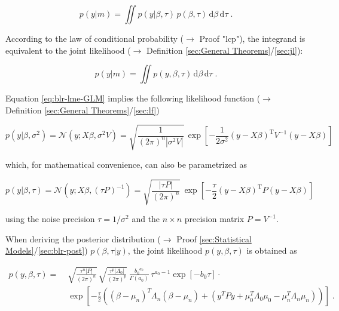 \documentclass[a4paper,12pt]{book}
\begin{document}
\begin{equation} \label{eq:blr-lme-GLM-NG-ME-s1}
p(y|m) = \iint p(y|\beta,\tau) \, p(\beta,\tau) \, \mathrm{d}\beta \, \mathrm{d}\tau \; .
\end{equation}

According to the law of conditional probability ($\rightarrow$ Proof "lcp"), the integrand is equivalent to the joint likelihood ($\rightarrow$ Definition \ref{sec:General Theorems}/\ref{sec:jl}):

\begin{equation} \label{eq:blr-lme-GLM-NG-ME-s2}
p(y|m) = \iint p(y,\beta,\tau) \, \mathrm{d}\beta \, \mathrm{d}\tau \; .
\end{equation}

Equation \eqref{eq:blr-lme-GLM} implies the following likelihood function ($\rightarrow$ Definition \ref{sec:General Theorems}/\ref{sec:lf})

\begin{equation} \label{eq:blr-lme-GLM-LF-class}
p(y|\beta,\sigma^2) = \mathcal{N}(y; X \beta, \sigma^2 V) = \sqrt{\frac{1}{(2 \pi)^n |\sigma^2 V|}} \, \exp\left[ -\frac{1}{2 \sigma^2} (y-X\beta)^\mathrm{T} V^{-1} (y-X\beta) \right]
\end{equation}

which, for mathematical convenience, can also be parametrized as

\begin{equation} \label{eq:blr-lme-GLM-LF-Bayes}
p(y|\beta,\tau) = \mathcal{N}(y; X \beta, (\tau P)^{-1}) = \sqrt{\frac{|\tau P|}{(2 \pi)^n}} \, \exp\left[ -\frac{\tau}{2} (y-X\beta)^\mathrm{T} P (y-X\beta) \right]
\end{equation}

using the noise precision $\tau = 1/\sigma^2$ and the $n \times n$ precision matrix $P = V^{-1}$.

\vspace{1em}
When deriving the posterior distribution ($\rightarrow$ Proof \ref{sec:Statistical Models}/\ref{sec:blr-post}) $p(\beta,\tau|y)$, the joint likelihood $p(y,\beta,\tau)$ is obtained as

\begin{equation} \label{eq:blr-lme-GLM-NG-LME-s1}
\begin{split}
p(y,\beta,\tau) = \; & \sqrt{\frac{\tau^n |P|}{(2 \pi)^n}} \, \sqrt{\frac{\tau^p |\Lambda_0|}{(2 \pi)^p}} \, \frac{ {b_0}^{a_0}}{\Gamma(a_0)} \, \tau^{a_0-1} \exp[-b_0 \tau] \cdot \\
& \exp\left[ -\frac{\tau}{2} \left( (\beta-\mu_n)^T \Lambda_n (\beta-\mu_n) + (y^T P y + \mu_0^T \Lambda_0 \mu_0 - \mu_n^T \Lambda_n \mu_n) \right) \right] \; .
\end{split}
\end{equation}
\end{document}
